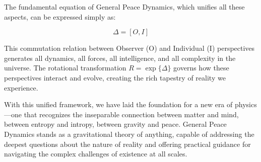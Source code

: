 \documentclass{article}
\begin{document}
The fundamental equation of General Peace Dynamics, which unifies all these aspects, can be expressed simply as:

\begin{equation}
\Delta = [O, I]
\end{equation}

This commutation relation between Observer (O) and Individual (I) perspectives generates all dynamics, all forces, all intelligence, and all complexity in the universe. The rotational transformation $R = \exp\{\Delta\}$ governs how these perspectives interact and evolve, creating the rich tapestry of reality we experience.

With this unified framework, we have laid the foundation for a new era of physics—one that recognizes the inseparable connection between matter and mind, between entropy and intropy, between gravity and peace. General Peace Dynamics stands as a gravitational theory of anything, capable of addressing the deepest questions about the nature of reality and offering practical guidance for navigating the complex challenges of existence at all scales.
\end{document}
